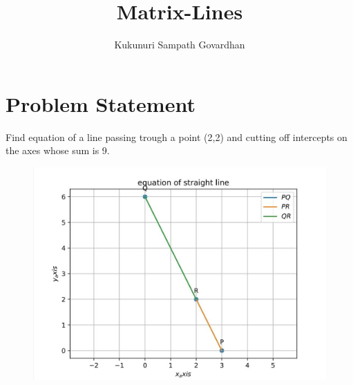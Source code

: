 \documentclass[journal,12pt,twocolumn]{IEEEtran}
\title{
Matrix-Lines
}
\author{Kukunuri Sampath Govardhan}
\begin{document}
\maketitle
\tableofcontents
\bigskip
\section{Problem Statement}
\fi
Find equation of a line passing trough a point (2,2) and cutting off intercepts on the axes whose sum is 9.
	\begin{figure}[!ht]
		\centering
 \includegraphics[width=\columnwidth]{chapters/11/10/2/13/figs/assign4.png}
		\caption{}
		\label{fig:11/10/2/13}
  	\end{figure}
	\\
	\solution 
\iffalse
\end{document}
